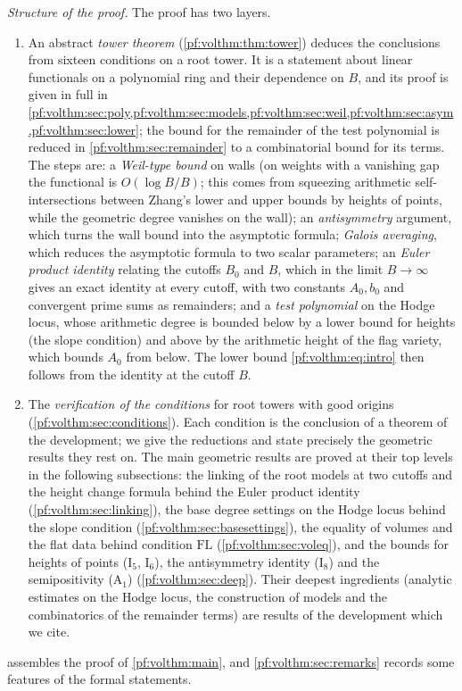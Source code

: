 \emph{Structure of the proof.} The proof has two layers.
\begin{enumerate}[label=(\arabic*)]
\item An abstract \emph{tower theorem} (\cref{pf:volthm:thm:tower}) deduces the conclusions from sixteen
  conditions on a root tower. It is a statement about linear functionals on a polynomial ring and their
  dependence on $B$, and its proof is given in full in
  \cref{pf:volthm:sec:poly,pf:volthm:sec:models,pf:volthm:sec:weil,pf:volthm:sec:asym,pf:volthm:sec:lower}; the bound for
  the remainder of the test polynomial is reduced in \cref{pf:volthm:sec:remainder} to a combinatorial bound for its
  terms.
  The steps are: a \emph{Weil-type bound} on walls (on weights with a vanishing gap the functional is
  $O(\log B/B)$; this comes from squeezing arithmetic self-intersections between Zhang's lower and upper
  bounds by heights of points, while the geometric degree vanishes on the wall); an \emph{antisymmetry}
  argument, which turns the wall bound into the asymptotic formula; \emph{Galois averaging}, which reduces
  the asymptotic formula to two scalar parameters; an \emph{Euler product identity} relating the cutoffs $B_0$
  and $B$, which in the limit $B\to\infty$ gives an exact identity at every cutoff, with two constants
  $A_0,b_0$ and convergent prime sums as remainders; and a \emph{test polynomial} on the Hodge locus, whose
  arithmetic degree is bounded below by a lower bound for heights (the slope condition) and above by the
  arithmetic height of the flag variety, which bounds $A_0$ from below. The lower bound
  \eqref{pf:volthm:eq:intro} then follows from the identity at the cutoff $B$.
\item The \emph{verification of the conditions} for root towers with good origins
  (\cref{pf:volthm:sec:conditions}). Each condition is the conclusion of a theorem of the development; we
  give the reductions and state precisely the geometric results they rest on. The main geometric results are
  proved at their top levels in the following subsections: the linking of the root models at two cutoffs and the
  height change formula behind the Euler product identity (\cref{pf:volthm:sec:linking}), the base degree settings
  on the Hodge locus behind the slope condition (\cref{pf:volthm:sec:basesettings}), the equality of volumes and the
  flat data behind condition $\mathrm{FL}$ (\cref{pf:volthm:sec:voleq}), and the bounds for heights of points
  ($\mathrm{I}_5$, $\mathrm{I}_6$), the antisymmetry identity ($\mathrm{I}_8$) and the semipositivity ($\mathrm{A}_1$)
  (\cref{pf:volthm:sec:deep}). Their deepest ingredients (analytic estimates on the Hodge locus, the construction of
  models and the combinatorics of the remainder terms) are results of the development which we cite.
\end{enumerate}
 assembles the proof of \cref{pf:volthm:main}, and
\cref{pf:volthm:sec:remarks} records some features of the formal statements.


